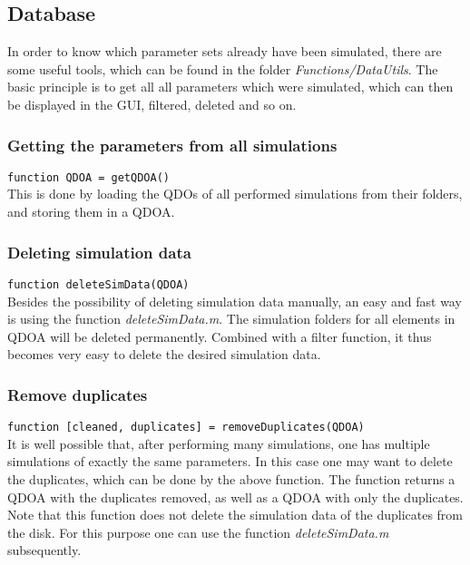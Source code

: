 \subsection{Database}
In order to know which parameter sets already have been simulated, there are some useful tools, which can be found in the folder \textit{Functions/DataUtils}. The basic principle is to get all all parameters which were simulated, which can then be displayed in the GUI, filtered, deleted and so on.

\subsubsection{Getting the parameters from all simulations}

\lstinline{function QDOA = getQDOA()}\\

This is done by loading the QDOs of all performed simulations from their folders, and storing them in a QDOA. 

\subsubsection{Deleting simulation data}

\lstinline{function deleteSimData(QDOA)}\\

Besides the possibility of deleting simulation data manually, an easy and fast way is using the function \textit{deleteSimData.m}. The simulation folders for all elements in QDOA will be deleted permanently. Combined with a filter function, it thus becomes very easy to delete the desired simulation data.

\subsubsection{Remove duplicates}
\lstinline{function [cleaned, duplicates] = removeDuplicates(QDOA)}\\

It is well possible that, after performing many simulations, one has multiple simulations of exactly the same parameters. In this case one may want to delete the duplicates, which can be done by the above function. The function returns a QDOA with the duplicates removed, as well as a QDOA with only the duplicates. Note that this function does not delete the simulation data of the duplicates from the disk. For this purpose one can use the function \textit{deleteSimData.m} subsequently.

